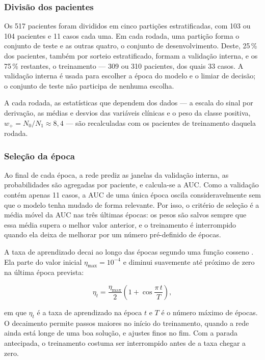 \subsubsection{Divisão dos pacientes}

Os 517 pacientes foram divididos em cinco partições estratificadas, com 103
ou 104 pacientes e 11 casos cada uma. Em cada rodada, uma partição forma o
conjunto de teste e as outras quatro, o conjunto de desenvolvimento. Deste,
25\,\% dos pacientes, também por sorteio estratificado, formam a validação
interna, e os 75\,\% restantes, o treinamento --- 309 ou 310 pacientes, dos
quais 33 casos. A validação interna é usada para escolher a época do modelo
e o limiar de decisão; o conjunto de teste não participa de nenhuma escolha.

A cada rodada, as estatísticas que dependem dos dados --- a escala do sinal
por derivação, as médias e desvios das variáveis clínicas e o peso da classe
positiva, $w_{+} = N_0/N_1 \approx 8{,}4$ --- são recalculadas com os
pacientes de treinamento daquela rodada.

\subsubsection{Seleção da época}

Ao final de cada época, a rede prediz as janelas da validação interna, as
probabilidades são agregadas por paciente, e calcula-se a \gls{AUC}. Como a
validação contém apenas 11 casos, a \gls{AUC} de uma única época oscila
consideravelmente sem que o modelo tenha mudado de forma relevante. Por isso,
o critério de seleção é a média móvel da \gls{AUC} nas três últimas épocas:
os pesos são salvos sempre que essa média supera o melhor valor anterior, e
o treinamento é interrompido quando ela deixa de melhorar por um número
pré-definido de épocas.

A taxa de aprendizado decai ao longo das épocas segundo uma função cosseno
\cite{loshchilov2017sgdr}. Ela parte do valor inicial $\eta_{\max} =
10^{-4}$ e diminui suavemente até próximo de zero na última época prevista:

\begin{equation}
	\eta_t = \frac{\eta_{\max}}{2}\left(1 + \cos\frac{\pi\, t}{T}\right),
	\label{eq:cosseno}
\end{equation}

\noindent
em que $\eta_t$ é a taxa de aprendizado na época $t$ e $T$ é o número máximo
de épocas. O decaimento permite passos maiores no início do treinamento,
quando a rede ainda está longe de uma boa solução, e ajustes finos no fim.
Com a parada antecipada, o treinamento costuma ser interrompido antes de a
taxa chegar a zero.

